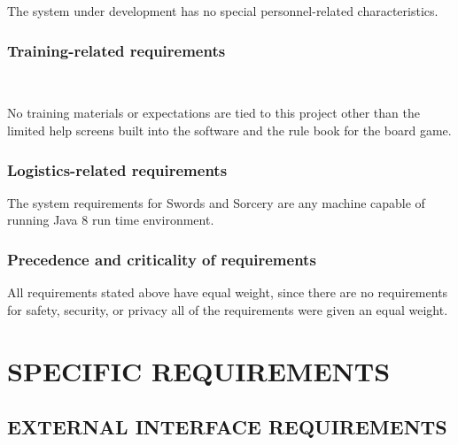 \documentclass[twoside,letterpaper,pdftex]{article}
\begin{document}
{\color{black}
The system under development has no special personnel-related characteristics. }

\subsubsection[Training{}-related requirements]{\rmfamily\bfseries\color{black} Training-related
requirements}
\hypertarget{RefHeading19659017292}{}{\color{black}
\foreignlanguage{english}{\textit{ }}\foreignlanguage{english}{ \ \ }}

{\color{black}
No training materials or expectations are tied to this project other than the limited help screens built into the
software and the rule book for the board game.}

\subsubsection[Logistics{}-related requirements]{\rmfamily\bfseries\color{black}
Logistics-related requirements}
\hypertarget{RefHeading19859017292}{}{\itshape\color{black}
}

{The system requirements for Swords and Sorcery are any machine capable of running Java 8 run time environment.}

\subsubsection[Precedence and criticality of requirements]{\rmfamily\bfseries\color{black}
Precedence and criticality of requirements}
\hypertarget{RefHeading20259017292}{}{\itshape\color{black}
}

{\color{black}
All requirements stated above have equal weight, since there are no requirements for safety, security, or privacy all of the requirements were given an equal weight.}

\clearpage\section[SPECIFIC REQUIREMENTS]{\rmfamily\bfseries\color{black} SPECIFIC REQUIREMENTS}
\hypertarget{RefHeading20459017292}{}{\itshape\color{black}
}

\subsection[EXTERNAL INTERFACE REQUIREMENTS]{\rmfamily\bfseries\color{black} EXTERNAL INTERFACE
REQUIREMENTS}
\hypertarget{RefHeading20659017292}{}{\itshape\color{black}
}
\end{document}
